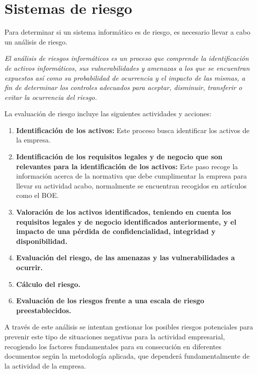 \chapter{Sistemas de riesgo}
\label{cha:sistemas-de-riesgo}
Para determinar si un sistema informático es de riesgo, es necesario llevar a cabo un análisis de riesgo.

\emph{El análisis de riesgos informáticos es un proceso que comprende la identificación de activos informáticos, sus vulnerabilidades y amenazas a los que se encuentran expuestos así como su probabilidad de ocurrencia y el impacto de las mismas, a fin de determinar los controles adecuados para aceptar, disminuir, transferir o evitar la ocurrencia del riesgo.\cite{wikip}}
        
La evaluación de riesgo incluye las siguientes actividades y acciones:
\begin{enumerate}
\item {\bfseries Identificación de los activos:}
Este proceso busca identificar los activos de la empresa.
\item {\bfseries Identificación de los requisitos legales y de negocio que son relevantes para la identificación de los activos:}
Este paso recoge la información acerca de la normativa que debe cumplimentar la empresa para llevar su actividad acabo, normalmente se encuentran recogidos en artículos como el BOE.
\item {\bfseries Valoración de los activos identificados, teniendo en cuenta los requisitos legales y de negocio identificados anteriormente, y el impacto de una pérdida de confidencialidad, integridad y disponibilidad.}
\item {\bfseries Evaluación del riesgo, de las amenazas y las vulnerabilidades a ocurrir.}
\item {\bfseries Cálculo del riesgo. }
\item {\bfseries Evaluación de los riesgos frente a una escala de riesgo preestablecidos.}
\end{enumerate}

A través de este análisis se intentan gestionar los posibles riesgos potenciales para prevenir este tipo de situaciones negativas para la actividad empresarial, recogiendo los factores fundamentales para su consecución en diferentes documentos según la metodología aplicada, que dependerá fundamentalmente de la actividad de la empresa.

